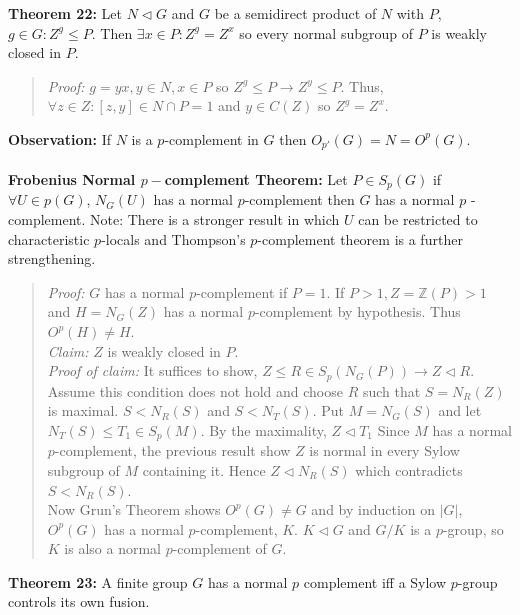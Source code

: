 {\bf Theorem 22:} 
Let $N \lhd G$ and $G$ be a semidirect product of $N$ with $P$, $g \in G: Z^g \le P$.  Then
$\exists x \in P: Z^g = Z^x$ so every normal subgroup of $P$ is weakly closed in $P$.
\begin{quote} 
\emph{Proof:}  
$g=yx, y \in N, x \in P$ so $Z^g \le P \rightarrow Z^y \le P$.  Thus, $\forall z \in Z:
[z,y] \in N \cap P =1$ and $y \in C(Z)$ so $Z^g=Z^x$.
\end{quote}
{\bf Observation:} If $N$ is a $p$-complement in $G$ then $O_{p'}(G)=N=O^{p}(G)$.
\\
\\
{\bf Frobenius Normal $p-$complement Theorem:}  Let $P \in S_p(G)$ if $\forall U \in p(G)$,
$N_G(U)$ has a normal $p$-complement then $G$ has a normal $p$ -complement.  Note: There is a
stronger result in which $U$ can be restricted to characteristic $p$-locals and Thompson's
$p$-complement theorem is a further strengthening.
\begin{quote}
\emph{Proof:}  
$G$ has a normal $p$-complement if $P = 1$.  If $P > 1, Z={\mathbb Z}(P) > 1$ and $H= N_G(Z)$ has a normal $p$-complement
by hypothesis.  Thus $O^p(H) \ne H$.\\
\emph{Claim:} $Z$ is weakly closed in $P$.
\\
\emph{Proof of claim:}  It suffices to show, $Z \le R \in S_p(N_G(P)) \rightarrow
Z \lhd R$.  Assume this condition does not hold and choose $R$ such that
$S=N_R(Z)$ is maximal.  $S < N_R(S)$ and $S < N_T(S)$.  Put $M= N_G(S)$ and let
$N_T(S) \le T_1 \in S_p(M)$.  By the maximality, $Z \lhd T_1$  Since $M$ has a normal $p$-complement, the
previous result show $Z$ is normal in every Sylow subgroup of $M$ containing it.  Hence
$Z \lhd N_R(S)$ which contradicts $S < N_R(S)$.
\\
Now Grun's Theorem shows $O^p(G) \ne G$ and by induction on $|G|$, $O^p(G)$ has a normal $p$-complement, $K$.
$K \lhd G$ and $G/K$ is a $p$-group, so $K$ is also a normal $p$-complement of $G$.
\end{quote}
{\bf Theorem 23:} A finite group $G$ has a normal $p$ complement iff a Sylow $p$-group
controls its own fusion.  
